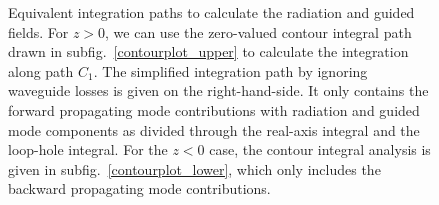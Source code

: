 \documentclass[preprint,aps,pra,onecolumn]{revtex4-1} %
\begin{document}
\begin{figure}
\begin{minipage}{.91\linewidth}
\centering
{}
\end{minipage}
\par\medskip
\begin{minipage}{.91\linewidth}
\centering
{}
\end{minipage}
\caption{Equivalent integration paths to calculate the radiation and guided fields. For $ z>0 $, we can use the zero-valued contour integral path drawn in subfig.~\ref{contourplot_upper} to calculate the integration along path $ C_1 $. The simplified integration path by ignoring waveguide losses is given on the right-hand-side. It only contains the forward propagating mode contributions with radiation and guided mode components as divided through the real-axis integral and the loop-hole integral. For the $ z<0 $ case, the contour integral analysis is given in subfig.~\ref{contourplot_lower}, which only includes the backward propagating mode contributions.}
\label{fig:integralpath}
\end{figure}
\end{document}
